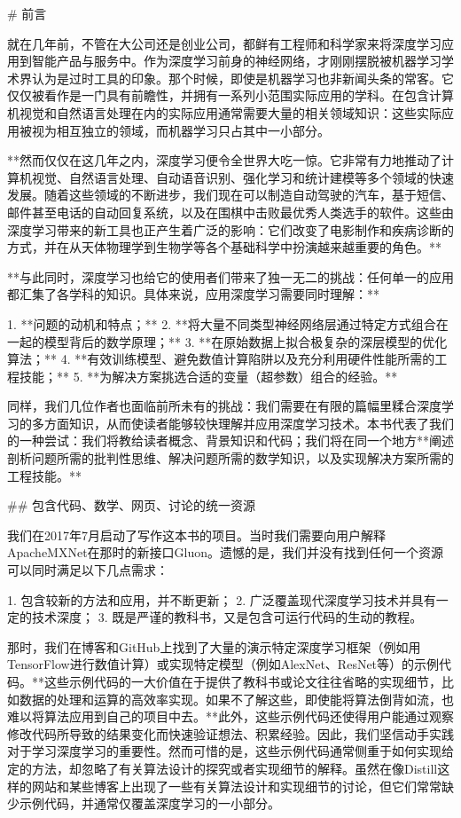 # 前言

就在几年前，不管在大公司还是创业公司，都鲜有工程师和科学家来将深度学习应用到智能产品与服务中。作为深度学习前身的神经网络，才刚刚摆脱被机器学习学术界认为是过时工具的印象。那个时候，即使是机器学习也非新闻头条的常客。它仅仅被看作是一门具有前瞻性，并拥有一系列小范围实际应用的学科。在包含计算机视觉和自然语言处理在内的实际应用通常需要大量的相关领域知识：这些实际应用被视为相互独立的领域，而机器学习只占其中一小部分。

**然而仅仅在这几年之内，深度学习便令全世界大吃一惊。它非常有力地推动了计算机视觉、自然语言处理、自动语音识别、强化学习和统计建模等多个领域的快速发展。随着这些领域的不断进步，我们现在可以制造自动驾驶的汽车，基于短信、邮件甚至电话的自动回复系统，以及在围棋中击败最优秀人类选手的软件。这些由深度学习带来的新工具也正产生着广泛的影响：它们改变了电影制作和疾病诊断的方式，并在从天体物理学到生物学等各个基础科学中扮演越来越重要的角色。**

**与此同时，深度学习也给它的使用者们带来了独一无二的挑战：任何单一的应用都汇集了各学科的知识。具体来说，应用深度学习需要同时理解：**

1. **问题的动机和特点；**
2. **将大量不同类型神经网络层通过特定方式组合在一起的模型背后的数学原理；**
3. **在原始数据上拟合极复杂的深层模型的优化算法；**
4. **有效训练模型、避免数值计算陷阱以及充分利用硬件性能所需的工程技能；**
5. **为解决方案挑选合适的变量（超参数）组合的经验。**

同样，我们几位作者也面临前所未有的挑战：我们需要在有限的篇幅里糅合深度学习的多方面知识，从而使读者能够较快理解并应用深度学习技术。本书代表了我们的一种尝试：我们将教给读者概念、背景知识和代码；我们将在同一个地方**阐述剖析问题所需的批判性思维、解决问题所需的数学知识，以及实现解决方案所需的工程技能。**

## 包含代码、数学、网页、讨论的统一资源

我们在2017年7月启动了写作这本书的项目。当时我们需要向用户解释ApacheMXNet在那时的新接口Gluon。遗憾的是，我们并没有找到任何一个资源可以同时满足以下几点需求：

1. 包含较新的方法和应用，并不断更新；
2. 广泛覆盖现代深度学习技术并具有一定的技术深度；
3. 既是严谨的教科书，又是包含可运行代码的生动的教程。

那时，我们在博客和GitHub上找到了大量的演示特定深度学习框架（例如用TensorFlow进行数值计算）或实现特定模型（例如AlexNet、ResNet等）的示例代码。**这些示例代码的一大价值在于提供了教科书或论文往往省略的实现细节，比如数据的处理和运算的高效率实现。如果不了解这些，即使能将算法倒背如流，也难以将算法应用到自己的项目中去。**此外，这些示例代码还使得用户能通过观察修改代码所导致的结果变化而快速验证想法、积累经验。因此，我们坚信动手实践对于学习深度学习的重要性。然而可惜的是，这些示例代码通常侧重于如何实现给定的方法，却忽略了有关算法设计的探究或者实现细节的解释。虽然在像Distill这样的网站和某些博客上出现了一些有关算法设计和实现细节的讨论，但它们常常缺少示例代码，并通常仅覆盖深度学习的一小部分。

